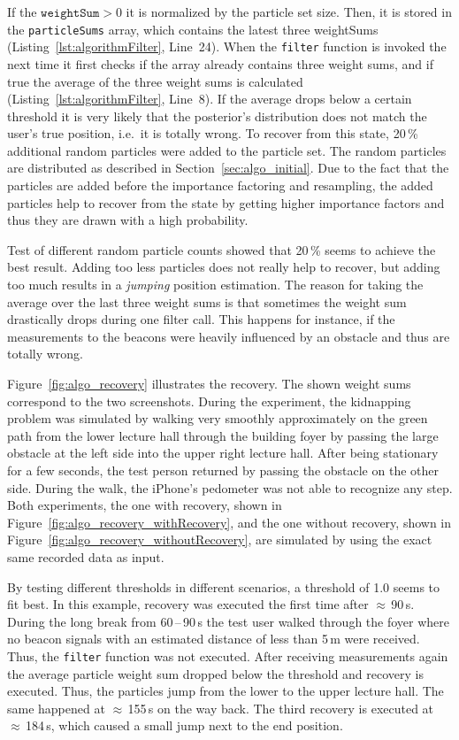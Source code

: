 If the $\texttt{weightSum} > 0$ it is normalized by the particle set size. Then, it is stored in the \texttt{particleSums} array, which contains the latest three weightSums (Listing~\ref{lst:algorithmFilter}, Line~24). When the \texttt{filter} function is invoked the next time it first checks if the array already contains three weight sums, and if true the average of the three weight sums is calculated (Listing~\ref{lst:algorithmFilter}, Line~8). If the average drops below a certain threshold it is very likely that the posterior's distribution does not match the user's true position, i.e.\ it is totally wrong. To recover from this state, 20\,\% additional random particles were added to the particle set. The random particles are distributed as described in Section~\ref{sec:algo_initial}. Due to the fact that the particles are added before the importance factoring and resampling, the added particles help to recover from the state by getting higher importance factors and thus they are drawn with a high probability.

Test of different random particle counts showed that 20\,\% seems to achieve the best result. Adding too less particles does not really help to recover, but adding too much results in a \emph{jumping} position estimation. The reason for taking the average over the last three weight sums is that sometimes the weight sum drastically drops during one filter call. This happens for instance, if the measurements to the beacons were heavily influenced by an obstacle and thus are totally wrong.

Figure~\ref{fig:algo_recovery} illustrates the recovery. The shown weight sums correspond to the two screenshots. During the experiment, the kidnapping problem was simulated by walking very smoothly approximately on the green path from the lower lecture hall through the building foyer by passing the large obstacle at the left side into the upper right lecture hall. After being stationary for a few seconds, the test person returned by passing the obstacle on the other side. During the walk, the iPhone's pedometer was not able to recognize any step. Both experiments, the one with recovery, shown in Figure~\ref{fig:algo_recovery_withRecovery}, and the one without recovery, shown in Figure~\ref{fig:algo_recovery_withoutRecovery}, are simulated by using the exact same recorded data as input.

By testing different thresholds in different scenarios, a threshold of 1.0 seems to fit best. In this example, recovery was executed the first time after $\approx$\,90\,s. During the long break from 60\,--\,90\,s the test user walked through the foyer where no beacon signals with an estimated distance of less than 5\,m were received. Thus, the \texttt{filter} function was not executed. After receiving measurements again the average particle weight sum dropped below the threshold and recovery is executed. Thus, the particles jump from the lower to the upper lecture hall. The same happened at $\approx$\,155\,s on the way back. The third recovery is executed at $\approx$\,184\,s, which caused a small jump next to the end position.

